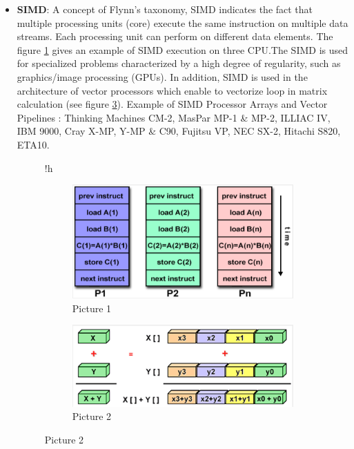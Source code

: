 \begin{itemize}
\item \textbf{SIMD}: A concept of Flynn's taxonomy, SIMD indicates the fact that multiple processing units (core) execute the same instruction on multiple data streams. Each processing unit can perform on different data elements. The figure \ref{simb} gives an example of SIMD execution on three CPU.The SIMD is used for specialized problems characterized by a high degree of regularity, such as graphics/image processing (GPUs). In addition, SIMD is used in the architecture of vector processors which enable to vectorize loop in matrix calculation (see figure \ref{vector}).  
Example of SIMD Processor Arrays and Vector Pipelines : Thinking Machines CM-2, MasPar MP-1 \& MP-2, ILLIAC IV, IBM 9000, Cray X-MP, Y-MP \& C90, Fujitsu VP, NEC SX-2, Hitachi S820, ETA10.
\begin{figure}{!h}
\centering 
  \begin{subfigure}[b]{0.4\textwidth}
    \includegraphics[width=\textwidth]{images/simd.png}
    \caption{Picture 1}
    \label{simb}
  \end{subfigure}
  \begin{subfigure}[b]{0.4\textwidth}
    \includegraphics[width=\textwidth]{images/vectorization.png}
    \caption{Picture 2}
    \label{vector}
  \end{subfigure}
\end{figure}


\end{itemize}
